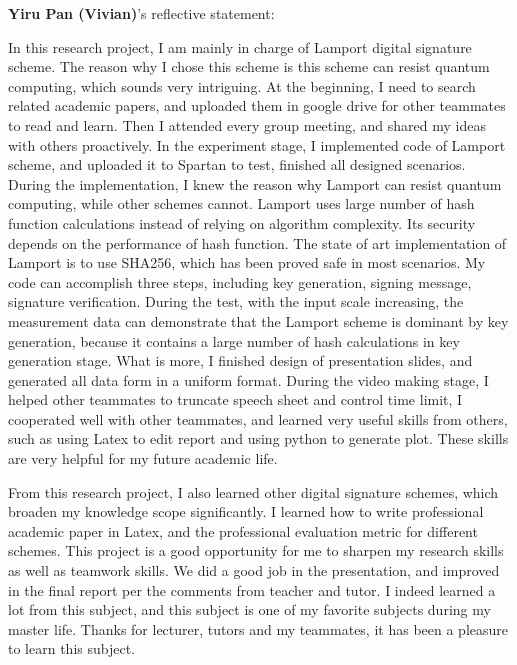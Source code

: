 \documentclass[10pt,sigconf]{acmart}
\begin{document}



\noindent \textbf{Yiru Pan (Vivian)}'s reflective statement:

In this research project, I am mainly in charge of Lamport digital signature scheme. The reason why I chose this scheme is this scheme can resist quantum computing, which sounds very intriguing. At the beginning, I need to search related academic papers, and uploaded them in google drive for other teammates to read and learn. Then I attended every group meeting, and shared my ideas with others proactively. In the experiment stage, I implemented code of Lamport scheme, and uploaded it to Spartan to test, finished all designed scenarios. During the implementation, I knew the reason why Lamport can resist quantum computing, while other schemes cannot. Lamport uses large number of hash function calculations instead of relying on algorithm complexity. Its security depends on the performance of hash function. The state of art implementation of Lamport is to use SHA256, which has been proved safe in most scenarios. My code can accomplish three steps, including key generation, signing message, signature verification. During the test, 
with the input scale increasing, the measurement data can demonstrate that the Lamport scheme is dominant by key generation, because it contains a large number of hash calculations in key generation stage.
 What is more, I finished design of presentation slides, and generated all data form in a uniform format. During the video making stage, I helped other teammates to truncate speech sheet and control time limit, I cooperated well with other teammates, and learned very useful skills from others, such as using Latex to edit report and using python to generate plot. These skills are very helpful for my future academic life.

From this research project, I also learned other digital signature schemes, which broaden my knowledge scope significantly. I learned how to write professional academic paper in Latex, and the professional evaluation metric for different schemes. This project is a good opportunity for me to sharpen my research skills as well as teamwork skills. We did a good job in the presentation, and improved in the final report per the comments from teacher and tutor. I indeed learned a lot from this subject, and this subject is one of my favorite subjects during my master life. Thanks for lecturer, tutors and my teammates, it has been a pleasure to learn this subject. 
\end{document}
